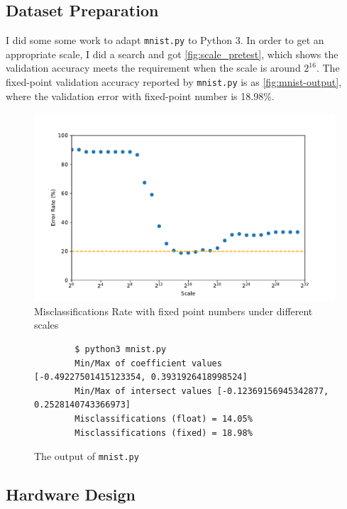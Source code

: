 
\subsection{Dataset Preparation}

I did some some work to adapt \nolinkurl{mnist.py} to Python 3.
In order to get an appropriate scale, I did a search and got \autoref{fig:scale_pretest}, which shows the validation accuracy meets the requirement when the scale is around \(2^{16}\).
The fixed-point validation accuracy reported by \nolinkurl{mnist.py} is as \autoref{fig:mnist-output}, where the validation error with fixed-point number is 18.98\%.

\begin{figure}[ht!]
    \centering
    \includegraphics[scale=0.64]{images/scale_pretest.pdf}
    \caption{Misclassifications Rate with fixed point numbers under different scales}
    \label{fig:scale_pretest}
\end{figure}

\begin{figure}[ht!]
    \begin{verbatim}
        $ python3 mnist.py
        Min/Max of coefficient values [-0.49227501415123354, 0.3931926418998524]
        Min/Max of intersect values [-0.12369156945342877, 0.2528140743366973]
        Misclassifications (float) = 14.05%
        Misclassifications (fixed) = 18.98%
    \end{verbatim}
    \caption{The output of \nolinkurl{mnist.py}}
    \label{fig:mnist-output}
\end{figure}

\subsection{Hardware Design}

